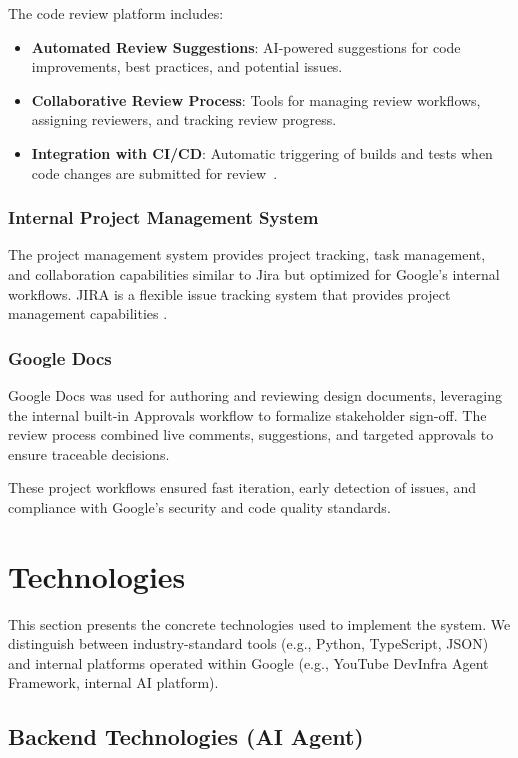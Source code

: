 \begin{spacing}{1.2}
The code review platform includes:
\begin{itemize}
    \item \textbf{Automated Review Suggestions}: AI-powered suggestions for code improvements, best practices, and potential issues.
    \item \textbf{Collaborative Review Process}: Tools for managing review workflows, assigning reviewers, and tracking review progress.
    \item \textbf{Integration with CI/CD}: Automatic triggering of builds and tests when code changes are submitted for review~\cite{ci_cd2010}.
\end{itemize}

\subsubsection{Internal Project Management System}
The project management system provides project tracking, task management, and collaboration capabilities similar to Jira but optimized for Google's internal workflows. JIRA is a flexible issue tracking system that provides project management capabilities \cite{jira2002}.


\subsubsection{Google Docs}
Google Docs was used for authoring and reviewing design documents, leveraging the internal built-in Approvals workflow to formalize stakeholder sign-off. The review process combined live comments, suggestions, and targeted approvals to ensure traceable decisions.


These project workflows ensured fast iteration, early detection of issues, and compliance with Google's security and code quality standards.



\section{Technologies}

This section presents the concrete technologies used to implement the system. We distinguish between industry-standard tools (e.g., Python, TypeScript, JSON) and internal platforms operated within Google (e.g., YouTube DevInfra Agent Framework, internal AI platform).

\subsection{Backend Technologies (AI Agent)}


\end{spacing}
